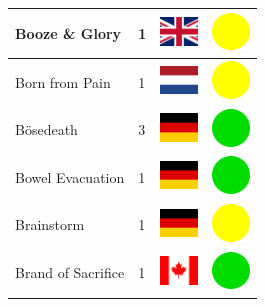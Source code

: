 \documentclass[12pt, a4paper, twoside]{report}
\begin{document}
\begin{center}
\begin{longtable}{|p{5cm}|p{2cm}|p{2cm}|p{2cm}|}
			Booze \& Glory & 1 & \includegraphics[width=1cm]{4x3/gb} & \includegraphics[width=1cm]{likes/m} \\ \hline
			Born from Pain & 1 & \includegraphics[width=1cm]{4x3/nl} & \includegraphics[width=1cm]{likes/m} \\ \hline
			Bösedeath & 3 & \includegraphics[width=1cm]{4x3/de} & \includegraphics[width=1cm]{likes/y} \\ \hline
			Bowel Evacuation & 1 & \includegraphics[width=1cm]{4x3/de} & \includegraphics[width=1cm]{likes/y} \\ \hline
			Brainstorm & 1 & \includegraphics[width=1cm]{4x3/de} & \includegraphics[width=1cm]{likes/m} \\ \hline
			Brand of Sacrifice & 1 & \includegraphics[width=1cm]{4x3/ca} & \includegraphics[width=1cm]{likes/y} \\ \hline

\end{longtable}
\end{center}
\end{document}
